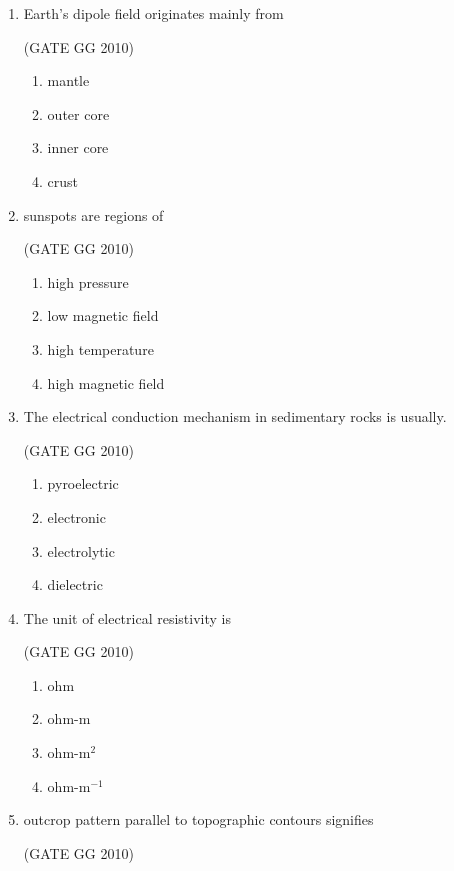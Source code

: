 \documentclass[journal]{IEEEtran}
\begin{document}
\begin{enumerate}[start=1]
\item Earth's dipole field originates mainly from

\hfill{(GATE GG 2010)}

\begin{enumerate}
\item mantle
\item outer core
\item inner core
\item crust
\end{enumerate}

\item  sunspots are regions of

\hfill{(GATE GG 2010)}

\begin{enumerate}
\item high pressure
\item low magnetic field
\item high temperature
\item high magnetic field
\end{enumerate}

\item  The electrical conduction mechanism in  sedimentary rocks is usually.

\hfill{(GATE GG 2010)}

\begin{enumerate}
\item pyroelectric
\item electronic
\item electrolytic
\item dielectric
\end{enumerate}


\item  The unit of electrical resistivity is

\hfill{(GATE GG 2010)}

\begin{enumerate}
\item ohm
\item ohm-m
\item ohm-m$^2$
\item ohm-m$^{-1}$
\end{enumerate}


\item  outcrop pattern parallel to topographic contours signifies

\hfill{(GATE GG 2010)}


\end{enumerate}
\end{document}
